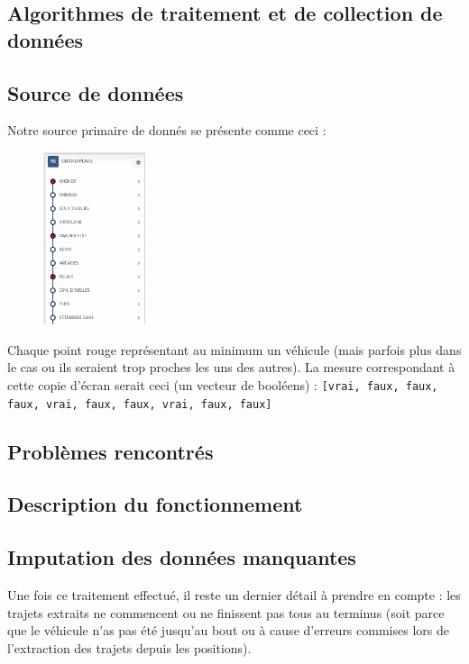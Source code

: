 \documentclass[letterpaper]{article}
\begin{document}
\newpage
\begin{appendices}
\section{Algorithmes de traitement et de collection de données}
\subsection{Source de données}
\label{align}
Notre source primaire de donnés se présente comme ceci :

\begin{figure}[h]
   \centerline{\includegraphics[width=3cm]{mstib.png}}
\end{figure}

Chaque point rouge représentant au minimum un véhicule (mais parfois plus dans le cas ou ils seraient trop proches les uns des autres). La mesure correspondant à cette copie d'écran serait ceci (un vecteur de booléens) : \texttt{[vrai, faux, faux, faux, vrai, faux, faux, vrai, faux, faux]}

\subsection{Problèmes rencontrés}

\subsection{Description du fonctionnement}

\subsection{Imputation des données manquantes}

Une fois ce traitement effectué, il reste un dernier détail à prendre en compte : les trajets extraits ne commencent ou ne finissent pas tous au terminus (soit parce que le véhicule n'as pas été jusqu'au bout ou à cause d'erreurs commises lors de l'extraction des trajets depuis les positions).


\end{appendices}
\end{document}
